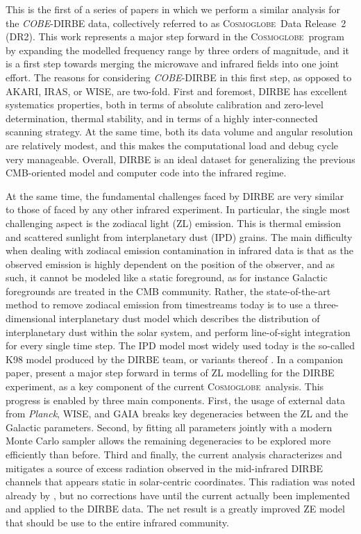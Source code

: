 \documentclass{aa}
\def\Cosmoglobe{\textsc{Cosmoglobe}}
\def\Planck{\textit{Planck}}
\def\COBE{\textit{COBE}}
\newcommand{\cosmoglobe}{\textsc{Cosmoglobe}}
\begin{document}
This is the first of a series of papers in which we perform a similar analysis for the \COBE-DIRBE data, collectively referred to as \cosmoglobe\ Data Release~2 (DR2). This work represents a major step forward in the \Cosmoglobe\ program by expanding the modelled frequency range by three orders of magnitude, and it is a first step towards merging the microwave and infrared fields into one joint effort. The reasons for considering \COBE-DIRBE in this first step, as opposed to AKARI, IRAS, or WISE, are two-fold. First and foremost, DIRBE has excellent systematics properties, both in terms of absolute calibration and zero-level determination, thermal stability, and in terms of a highly inter-connected scanning strategy. At the same time, both its data volume and angular resolution are relatively modest, and this makes the computational load and debug cycle very manageable. Overall, DIRBE is an ideal dataset for generalizing the previous CMB-oriented model and computer code into the infrared regime.

At the same time, the fundamental challenges faced by DIRBE are very similar to those of faced by any other infrared experiment. In particular, the single most challenging aspect is the zodiacal light (ZL) emission. This is thermal emission and scattered sunlight from interplanetary dust (IPD) grains. The main difficulty when dealing with zodiacal emission contamination in infrared data is that as the observed emission is highly dependent on the position of the observer, and as such, it cannot be modeled like a static foreground, as for instance Galactic foregrounds are treated in the CMB community. Rather, the state-of-the-art method to remove zodiacal emission from timestreams today is to use a three-dimensional interplanetary dust model which describes the distribution of interplanetary dust within the solar system, and perform line-of-sight integration for every single time step. The IPD model most widely used today is the so-called K98 model \citep{kelsall1998} produced by the DIRBE team, or variants thereof \citep[e.g.,][]{planck2013-pip88}. In a companion paper, \citet{CG02_02} present a major step forward in terms of ZL modelling for the DIRBE experiment, as a key component of the current \cosmoglobe\ analysis. This progress is enabled by three main components. First, the usage of external data from \Planck, WISE, and GAIA breaks key degeneracies between the ZL and the Galactic parameters. Second, by fitting all parameters jointly with a modern Monte Carlo sampler allows the remaining degeneracies to be explored more efficiently than before. Third and finally, the current analysis characterizes and mitigates a source of excess radiation observed in the mid-infrared DIRBE channels that appears static in solar-centric coordinates. This radiation was noted already by \citet{leinert:1998}, but no corrections have until the current actually been implemented and applied to the DIRBE data. The net result is a greatly improved ZE model that should be use to the entire infrared community.
\end{document}
